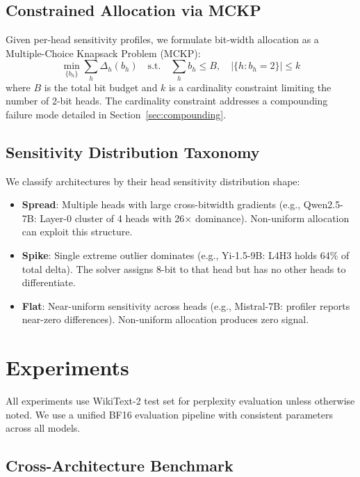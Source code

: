 \documentclass[11pt,a4paper]{article}
\begin{document}
\subsection{Constrained Allocation via MCKP}

Given per-head sensitivity profiles, we formulate bit-width allocation as a Multiple-Choice Knapsack Problem (MCKP):
\begin{equation}
\min_{\{b_h\}} \sum_h \Delta_h(b_h) \quad \text{s.t.} \quad \sum_h b_h \leq B, \quad |\{h : b_h = 2\}| \leq k
\end{equation}
where $B$ is the total bit budget and $k$ is a cardinality constraint limiting the number of 2-bit heads.
The cardinality constraint addresses a compounding failure mode detailed in Section~\ref{sec:compounding}.

\subsection{Sensitivity Distribution Taxonomy}\label{sec:taxonomy}

We classify architectures by their head sensitivity distribution shape:
\begin{itemize}[nosep,leftmargin=*]
\item \textbf{Spread}: Multiple heads with large cross-bitwidth gradients (e.g., Qwen2.5-7B: Layer-0 cluster of 4 heads with 26$\times$ dominance). Non-uniform allocation can exploit this structure.
\item \textbf{Spike}: Single extreme outlier dominates (e.g., Yi-1.5-9B: L4H3 holds 64\% of total delta). The solver assigns 8-bit to that head but has no other heads to differentiate.
\item \textbf{Flat}: Near-uniform sensitivity across heads (e.g., Mistral-7B: profiler reports near-zero differences). Non-uniform allocation produces zero signal.
\end{itemize}

\section{Experiments}\label{sec:experiments}

All experiments use WikiText-2 test set for perplexity evaluation unless otherwise noted. We use a unified BF16 evaluation pipeline with consistent parameters across all models.

\subsection{Cross-Architecture Benchmark}\label{sec:cross_arch}
\end{document}
